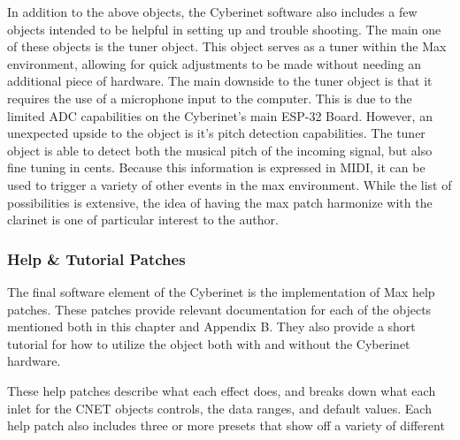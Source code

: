 In addition to the above objects, the Cyberinet software also includes a few objects intended to be helpful in setting up and trouble shooting. The main one of these objects is the tuner object. This object serves as a tuner within the Max environment, allowing for quick adjustments to be made without needing an additional piece of hardware. 
The main downside to the tuner object is that it requires the use of a microphone input to the computer. This is due to the limited ADC capabilities on the Cyberinet's main ESP-32 Board. However, an unexpected upside to the object is it's pitch detection capabilities. The tuner object is able to detect both the musical pitch of the incoming signal, but also fine tuning in cents. Because this information is expressed in MIDI, it can be used to trigger a variety of other events in the max environment. While the list of possibilities is extensive, the idea of having the max patch harmonize with the clarinet is one of particular interest to the author.

\subsubsection{Help \& Tutorial Patches}
The final software element of the Cyberinet is the implementation of Max help patches. These patches provide relevant documentation for each of the objects mentioned both in this chapter and Appendix B. They also provide a short tutorial for how to utilize the object both with and without the Cyberinet hardware. 

These help patches describe what each effect does, and breaks down what each inlet for the CNET objects controls, the data ranges, and default values. Each help patch also includes three or more presets that show off a variety of different 


